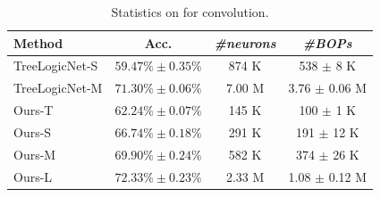 \begin{table}[!htbp]
\centering
\caption{Statistics on \cifar for convolution.}
\label{tb:CLGN_CIFAR_rs}
\begin{tabular}{lccc}
\toprule
Method & Acc. & \emph{\#neurons} & \emph{\#BOPs} \\
\midrule
TreeLogicNet-S    & $59.47\% \pm 0.35\%$ & 874 K & 538 $\pm$ 8 K \\
TreeLogicNet-M    & $71.30\% \pm 0.06\%$ & 7.00 M & 3.76 $\pm$ 0.06 M \\
\midrule
Ours-T	& \textbf{$62.24\% \pm 0.07\%$} & 145 K & 100 $\pm$ 1 K \\
Ours-S	& \textbf{$66.74\% \pm 0.18\%$} & 291 K & 191 $\pm$ 12 K \\
Ours-M	& \textbf{$69.90\% \pm 0.24\%$} & 582 K & 374 $\pm$ 26 K \\
Ours-L	& \textbf{$72.33\% \pm 0.23\%$} & 2.33 M & 1.08 $\pm$ 0.12 M \\
\bottomrule
\end{tabular}
\end{table}
